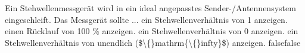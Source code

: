     {Ein Stehwellenmessgerät wird in ein ideal angepasstes Sender-/Antennensystem eingeschleift. Das Messgerät sollte ...}
    {ein Stehwellenverhältnis von 1 anzeigen.}
    {einen Rücklauf von 100 \% anzeigen.}
    {ein Stehwellenverhältnis von 0 anzeigen.}
    {ein Stehwellenverhältnis von unendlich (\$\textbackslash\{\}mathrm\{\textbackslash\{\}infty\}\$) anzeigen.}
    {false}{false}
